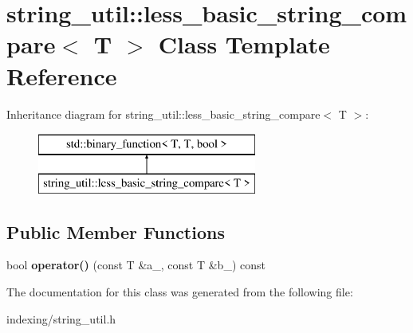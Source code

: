 \hypertarget{classstring__util_1_1less__basic__string__compare}{\section{string\-\_\-util\-:\-:less\-\_\-basic\-\_\-string\-\_\-compare$<$ T $>$ Class Template Reference}
\label{classstring__util_1_1less__basic__string__compare}
}
Inheritance diagram for string\-\_\-util\-:\-:less\-\_\-basic\-\_\-string\-\_\-compare$<$ T $>$\-:\begin{figure}[H]
\begin{center}
\leavevmode
\includegraphics[height=2.000000cm]{classstring__util_1_1less__basic__string__compare}
\end{center}
\end{figure}
\subsection*{Public Member Functions}
\begin{DoxyCompactItemize}
\item 
\hypertarget{classstring__util_1_1less__basic__string__compare_a259341e58f36d8aaf75f2415de0df4d8}{bool {\bfseries operator()} (const T \&a\-\_\-, const T \&b\-\_\-) const }\label{classstring__util_1_1less__basic__string__compare_a259341e58f36d8aaf75f2415de0df4d8}

\end{DoxyCompactItemize}


The documentation for this class was generated from the following file\-:\begin{DoxyCompactItemize}
\item 
indexing/string\-\_\-util.\-h\end{DoxyCompactItemize}

